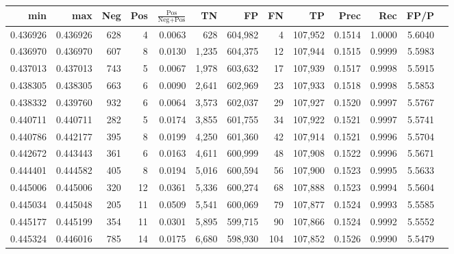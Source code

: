 \begin{tabular}{rrrrrrrrrrrrr}
\toprule
     min &      max &   Neg &   Pos & $\frac{\text{Pos}}{\text{Neg}+\text{Pos}}$ &      TN &      FP &      FN &      TP &   Prec &    Rec &   FP/P \\
\midrule
0.436926 & 0.436926 &   628 &     4 &                                     0.0063 &     628 & 604,982 &       4 & 107,952 & 0.1514 & 1.0000 & 5.6040 \\
0.436970 & 0.436970 &   607 &     8 &                                     0.0130 &   1,235 & 604,375 &      12 & 107,944 & 0.1515 & 0.9999 & 5.5983 \\
0.437013 & 0.437013 &   743 &     5 &                                     0.0067 &   1,978 & 603,632 &      17 & 107,939 & 0.1517 & 0.9998 & 5.5915 \\
0.438305 & 0.438305 &   663 &     6 &                                     0.0090 &   2,641 & 602,969 &      23 & 107,933 & 0.1518 & 0.9998 & 5.5853 \\
0.438332 & 0.439760 &   932 &     6 &                                     0.0064 &   3,573 & 602,037 &      29 & 107,927 & 0.1520 & 0.9997 & 5.5767 \\
0.440711 & 0.440711 &   282 &     5 &                                     0.0174 &   3,855 & 601,755 &      34 & 107,922 & 0.1521 & 0.9997 & 5.5741 \\
0.440786 & 0.442177 &   395 &     8 &                                     0.0199 &   4,250 & 601,360 &      42 & 107,914 & 0.1521 & 0.9996 & 5.5704 \\
0.442672 & 0.443443 &   361 &     6 &                                     0.0163 &   4,611 & 600,999 &      48 & 107,908 & 0.1522 & 0.9996 & 5.5671 \\
0.444401 & 0.444582 &   405 &     8 &                                     0.0194 &   5,016 & 600,594 &      56 & 107,900 & 0.1523 & 0.9995 & 5.5633 \\
0.445006 & 0.445006 &   320 &    12 &                                     0.0361 &   5,336 & 600,274 &      68 & 107,888 & 0.1523 & 0.9994 & 5.5604 \\
0.445034 & 0.445048 &   205 &    11 &                                     0.0509 &   5,541 & 600,069 &      79 & 107,877 & 0.1524 & 0.9993 & 5.5585 \\
0.445177 & 0.445199 &   354 &    11 &                                     0.0301 &   5,895 & 599,715 &      90 & 107,866 & 0.1524 & 0.9992 & 5.5552 \\
0.445324 & 0.446016 &   785 &    14 &                                     0.0175 &   6,680 & 598,930 &     104 & 107,852 & 0.1526 & 0.9990 & 5.5479 \\

\end{tabular}
